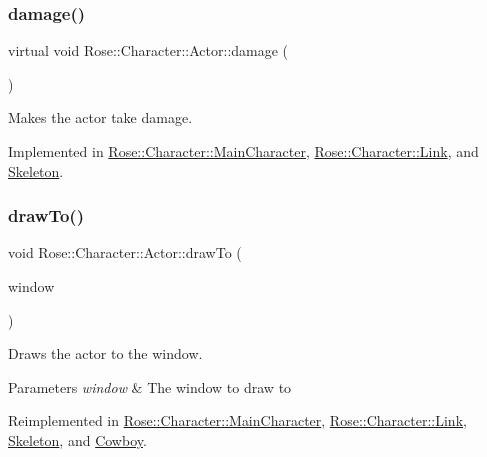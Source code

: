 \subsubsection{\texorpdfstring{damage()}{damage()}}
{\footnotesize\ttfamily virtual void Rose\+::\+Character\+::\+Actor\+::damage (\begin{DoxyParamCaption}{ }\end{DoxyParamCaption})\hspace{0.3cm}{\ttfamily [pure virtual]}}



Makes the actor take damage. 



Implemented in \mbox{\hyperlink{classRose_1_1Character_1_1MainCharacter_a95fd982ce2de2f75067e68fc4ec49fdc}{Rose\+::\+Character\+::\+Main\+Character}}, \mbox{\hyperlink{classRose_1_1Character_1_1Link_a7918cd89bf9da3eced41055567c7c27c}{Rose\+::\+Character\+::\+Link}}, and \mbox{\hyperlink{classSkeleton_a43f844458b102aa18c65bcbbc5078e27}{Skeleton}}.

\mbox{\label{classRose_1_1Character_1_1Actor_a1433ef76e892a8c57597115071c256d8}} 
\subsubsection{\texorpdfstring{drawTo()}{drawTo()}}
{\footnotesize\ttfamily void Rose\+::\+Character\+::\+Actor\+::draw\+To (\begin{DoxyParamCaption}\item[{sf\+::\+Render\+Window \&}]{window }\end{DoxyParamCaption})\hspace{0.3cm}{\ttfamily [virtual]}}



Draws the actor to the window. 


\begin{DoxyParams}{Parameters}
{\em window} & The window to draw to \\
\hline
\end{DoxyParams}


Reimplemented in \mbox{\hyperlink{classRose_1_1Character_1_1MainCharacter_a6c30ae81a27fa3cc5fff16ebe7c9f8be}{Rose\+::\+Character\+::\+Main\+Character}}, \mbox{\hyperlink{classRose_1_1Character_1_1Link_a7992daadbfc55011376b94604909668c}{Rose\+::\+Character\+::\+Link}}, \mbox{\hyperlink{classSkeleton_aa39ac09590a5274536dc2fc125cc62e6}{Skeleton}}, and \mbox{\hyperlink{classCowboy_af7e8a3e9cdcd9054b63a3661ca3f69a6}{Cowboy}}.


